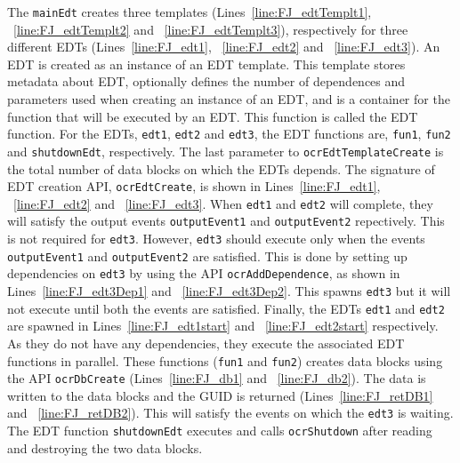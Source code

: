 The \texttt{mainEdt} creates three templates (Lines~\ref{line:FJ_edtTemplt1}, ~\ref{line:FJ_edtTemplt2}
and ~\ref{line:FJ_edtTemplt3}), respectively for three different EDTs
(Lines~\ref{line:FJ_edt1}, ~\ref{line:FJ_edt2} and ~\ref{line:FJ_edt3}).
An EDT is created as an instance of an EDT template.
This template stores metadata about EDT,
optionally defines the number of dependences and parameters used when
creating an instance of an EDT, and is a container for the function
that will be executed by an EDT. This function is called the EDT function.
For the EDTs, \texttt{edt1}, \texttt{edt2} and \texttt{edt3}, the EDT functions
are, \texttt{fun1}, \texttt{fun2} and \texttt{shutdownEdt}, respectively.
The last parameter to \texttt{ocrEdtTemplateCreate} is the total number of
data blocks on which the EDTs depends. The signature of EDT creation API,
\texttt{ocrEdtCreate}, is shown in Lines~\ref{line:FJ_edt1}, ~\ref{line:FJ_edt2}
and ~\ref{line:FJ_edt3}. When \texttt{edt1} and \texttt{edt2} will complete,
they will satisfy the output events \texttt{outputEvent1} and \texttt{outputEvent2} repectively.
This is not required for \texttt{edt3}. However, \texttt{edt3} should execute only
when the events \texttt{outputEvent1} and \texttt{outputEvent2} are satisfied.
This is done by setting up dependencies on \texttt{edt3} by using the API \texttt{ocrAddDependence},
as shown in Lines~\ref{line:FJ_edt3Dep1} and ~\ref{line:FJ_edt3Dep2}.
This spawns \texttt{edt3} but it will not execute until both the events
are satisfied. Finally, the EDTs \texttt{edt1} and \texttt{edt2} are
spawned in Lines~\ref{line:FJ_edt1start} and ~\ref{line:FJ_edt2start} respectively.
As they do not have any dependencies, they execute the associated EDT functions
in parallel. These functions (\texttt{fun1} and \texttt{fun2}) creates
data blocks using the API \texttt{ocrDbCreate} (Lines~\ref{line:FJ_db1} and ~\ref{line:FJ_db2}).
The data is written to the data blocks and the GUID is returned (Lines~\ref{line:FJ_retDB1}
and ~\ref{line:FJ_retDB2}). This will satisfy the events on which the \texttt{edt3}
is waiting. The EDT function \texttt{shutdownEdt} executes
and calls \texttt{ocrShutdown} after reading and destroying the two data blocks.

